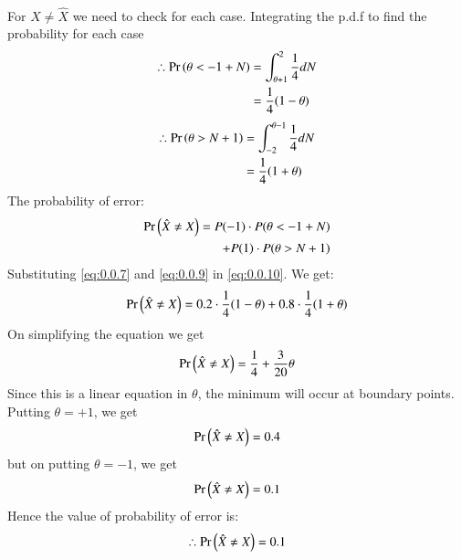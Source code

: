 \documentclass[journal,12pt,twocolumn]{IEEEtran}
\begin{document}
\\
For $X \neq \hat{X}$ we need to check for each case. Integrating the p.d.f to find the probability for each case
\begin{align}
\therefore
    \Pr\left(\theta < -1 + N\right) &= \int_{\theta + 1}^2 \frac{1}{4}dN\\
    &= \frac{1}{4}(1-\theta)\label{eq:0.0.7}
\end{align}
\begin{align}
\therefore
    \Pr\left(\theta> N + 1\right) &= \int_{-2}^{\theta -1} \frac{1}{4}dN\\
    &= \frac{1}{4}(1+\theta)\label{eq:0.0.9}
\end{align}
The probability of error:
\begin{align}
\nonumber
    \Pr\left(\hat{X} \neq X\right) = P(-1)\cdot {P(\theta < -1 + N)} \\ 
            \quad+ P(1)\cdot {P(\theta> N + 1)}\label{eq:0.0.10}
\end{align}
Substituting \eqref{eq:0.0.7} and \eqref{eq:0.0.9} in \eqref{eq:0.0.10}. We get:
\begin{align}
    \Pr\left(\hat{X} \neq X\right) = 0.2\cdot \frac{1}{4}(1-\theta) + 0.8\cdot \frac{1}{4}(1+\theta)
\end{align}
On simplifying the equation we get
\begin{align}
    \Pr\left(\hat{X} \neq X\right) = \frac{1}{4} + \frac{3}{20}\theta
\end{align}
Since this is a linear equation in $\theta$, the minimum will occur at boundary points.
Putting $\theta = +1$, we get
\begin{align}
    \Pr\left(\hat{X} \neq X\right) = 0.4
\end{align}
but on putting $\theta = -1$, we get
\begin{align}
    \Pr\left(\hat{X} \neq X\right) = 0.1\\
\end{align}
Hence the value of probability of error is:
\begin{align}
    \therefore \Pr\left(\hat{X} \neq X\right) = 0.1
\end{align}
\end{document}
